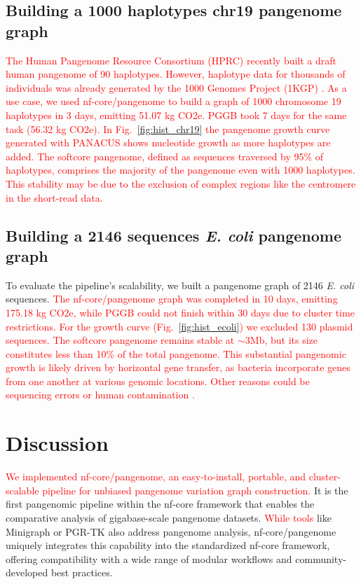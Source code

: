 \documentclass{bioinfo}
\theoremstyle{definition}
\newcommand{\red}[1]{{\textcolor{Red}{#1}}}
\begin{document}
	\subsection{Building a 1000 haplotypes chr19 pangenome graph}
	
	\red{The Human Pangenome Resource Consortium (HPRC) recently built a draft human pangenome of 90 haplotypes.
	However, haplotype data for thousands of individuals was already generated by the 1000 Genomes Project (1KGP) \citep{Durbin2010}. 
	As a use case, we used nf-core/pangenome to build a graph of 1000 chromosome 19 haplotypes \citep{Kuhnle2020} in 3 days, emitting 51.07 kg CO2e.
	PGGB took 7 days for the same task (56.32 kg CO2e). 
	In Fig.~\ref{fig:hist_chr19} the pangenome growth curve generated with PANACUS \citep{Liao2023} shows nucleotide growth as more haplotypes are added.}
	\red{The softcore pangenome, defined as sequences traversed by 95\% of haplotypes, comprises the majority of the pangenome even with 1000 haplotypes. 
	This stability may be due to the exclusion of complex regions like the centromere in the short-read data.
	}

	
	\subsection{Building a 2146 sequences \textit{E. coli} pangenome graph}
	
	To evaluate the pipeline’s scalability, we built a pangenome graph of 2146 \textit{E. coli} sequences. 
\red{	The nf-core/pangenome graph was completed in 10 days, emitting 175.18 kg CO2e, while PGGB could not finish within 30 days due to cluster time restrictions.}
\red{	For the growth curve (Fig.~\ref{fig:hist_ecoli}) we excluded 130 plasmid sequences. 
	The softcore pangenome remains stable at $\sim$3Mb, but its size constitutes less than 10\% of the total pangenome.}
\red{	This substantial pangenomic growth is likely driven by horizontal gene transfer, as bacteria incorporate genes from one another at various genomic locations.
	Other reasons could be sequencing errors or human contamination \citep{Breitwieser2019}.}

	\vspace{-0.5cm}
	\section{Discussion}
	
	\red{We implemented nf-core/pangenome, an easy-to-install, portable, and cluster-scalable pipeline for unbiased pangenome variation graph construction.}
    It is the first pangenomic pipeline within the nf-core framework that enables the comparative analysis of gigabase-scale pangenome datasets. 
    \red{While tools} like Minigraph \citep{Li_2020} or PGR-TK \citep{Chin2023} also address pangenome analysis, nf-core/pangenome uniquely integrates this capability into the standardized nf-core framework, offering compatibility with a wide range of modular workflows and community-developed best practices.
    
\end{document}
